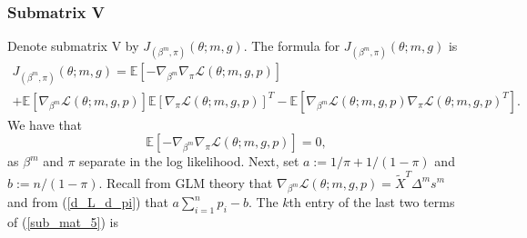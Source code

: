 \documentclass[12pt]{article}
\begin{document}
\begin{appendices}
\begin{refsection}
		\subsubsection*{Submatrix V}
		Denote submatrix V by $J_{(\beta^m,\pi)}(\theta; m, g).$ The formula for $J_{(\beta^m,\pi)}(\theta; m, g)$ is
		\begin{multline}\label{sub_mat_5}
		J_{(\beta^m,\pi)}(\theta; m, g) = \mathbb{E} \left[ - \nabla_{\beta^m} \nabla_{ \pi } \mathcal{L}(\theta; m, g, p) \right] \\ + \mathbb{E}\left[ \nabla_{\beta^m}\mathcal{L}(\theta ; m,g,p) \right] \mathbb{E} \left[ \nabla_{\pi}\mathcal{L}(\theta ; m,g,p) \right]^T  - \mathbb{E} \left[ \nabla_{\beta^m}\mathcal{L}(\theta; m,g,p) \nabla_{\pi}\mathcal{L}(\theta; m,g,p)^T \right].
		\end{multline}
		We have that
		\begin{equation}\label{sub_mat_5_1}
		\mathbb{E} \left[ - \nabla_{\beta^m} \nabla_{ \pi } \mathcal{L}(\theta; m, g, p) \right] = 0,
		\end{equation}
		as $\beta^m$ and $\pi$ separate in the log likelihood. Next, set $a := 1/\pi + 1/(1 - \pi)$ and $b := n/(1 - \pi).$ Recall from GLM theory that
		$\nabla_{\beta^m} \mathcal{L}(\theta; m, g, p) = \tilde{X}^T \Delta^m s^m$ and from (\ref{d_L_d_pi}) that
		$a \sum_{i=1}^n p_i - b.$
		The $k$th entry of the last two terms of (\ref{sub_mat_5}) is
		\begin{multline}\label{sub_mat_5_2}

\end{multline}
\end{refsection}
\end{appendices}
\end{document}
